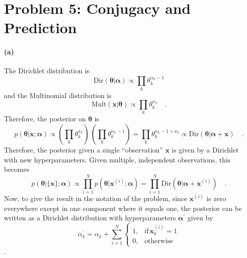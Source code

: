 \documentclass[11pt]{article}
\newcommand{\pr}[1]{\ensuremath{p(#1)}}
\newcommand{\bvec}[1]{\ensuremath{\boldsymbol{#1}}}
\renewcommand{\vector}[1]{\bvec{#1}}
\begin{document}
\section{Problem 5: Conjugacy and Prediction}

\paragraph{(a)} The Dirichlet distribution is
\begin{equation}
    \mathrm{Dir} (\vector{\theta} | \vector{\alpha})
        \propto \prod_k \theta_k^{\alpha_k-1}
\end{equation}
and the Multinomial distribution is
\begin{equation}
    \mathrm{Mult} (\vector{x} | \vector{\theta}) \propto
    \prod_k \theta_k^{x_k} \quad .
\end{equation}
Therefore, the posterior on \vector{\theta} is
\begin{equation}
    \pr{\vector{\theta}|\vector{x};\vector{\alpha}} \propto
        \left ( \prod_k \theta_k^{x_k} \right )\,
        \left ( \prod_k \theta_k^{\alpha_k-1} \right )
        =  \prod_k \theta_k^{\alpha_k-1+x_k} \propto
        \mathrm{Dir} (\vector{\theta} | \vector{\alpha} + \vector{x}) \quad .
\end{equation}
Therefore, the posterior given a single ``observation'' $\vector{x}$ is
given by a Dirichlet with new hyperparameters. Given multiple, independent
observations, this becomes
\begin{equation}
    \pr{\vector{\theta}|\{\vector{x}\};\vector{\alpha}} \propto
    \prod_{i=1}^{N} \pr{\vector{\theta}|\vector{x}^{(i)};\vector{\alpha}}
    = \prod_{i=1}^{N}
        \mathrm{Dir} (\vector{\theta} | \vector{\alpha} + \vector{x}^{(i)})\quad .
\end{equation}
Now, to give the result in the notation of the problem,
since $\vector{x}^{(i)}$ is zero everywhere except in one
component where it equals one, the posterior can be written as a Dirichlet
distribution with hyperparameters $\vector{\alpha}^\prime$ given by
\begin{equation}
    \alpha_k^\prime = \alpha_k + \sum_{i=1}^N \left \{ \begin{array}{ll}
        1, & \mathrm{if} \, \vector{x}^{(i)}_k = 1 \\
        0, & \mathrm{otherwise}
    \end{array}\right .
\end{equation} \quad .
\end{document}
